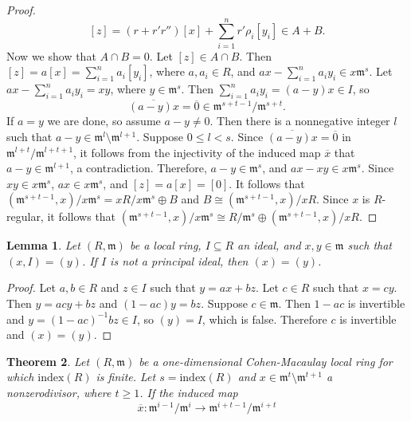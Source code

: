 \documentclass{amsart}
\newtheorem{theorem}{Theorem}[section]
\newtheorem{lemma}[theorem]{Lemma}
\theoremstyle{definition}
\theoremstyle{definition}
\numberwithin{equation}{section}
\theoremstyle{definition}
\begin{document}
{\begin{proof}
 \[[z]=(r+r'r'')[x]+\sum_{i=1}^{n}r'\rho_{i}[y_{i}] \in A+B.\]\text{}\newline
Now we show that $A \cap B=0$. Let $[z] \in A \cap B$. Then $[z]=a[x]=\sum_{i=1}^{n}a_{i}[y_{i}]$, where $a,a_{i} \in R$, and $ax-\sum_{i=1}^{n}a_{i}y_{i}\in x\mathfrak{m}^{s}$. Let $ax-\sum_{i=1}^{n}a_{i}y_{i}=xy$, where $y \in \mathfrak{m}^{s}$. Then $\sum_{i=1}^{n}a_{i}y_{i}=(a-y)x \in I$, so \newline
\[\overline{(a-y)x}=\overline{0} \in \mathfrak{m}^{s+t-1}/\mathfrak{m}^{s+t}.\]\text{}\newline If $a=y$ we are done, so assume $a-y \neq 0$. Then there is a nonnegative integer $l$ such that $a-y \in \mathfrak{m}^{l} \setminus \mathfrak{m}^{l+1}$. Suppose $0 \leq l<s$. Since $\overline{(a-y)x}=\overline{0}$ in $\mathfrak{m}^{l+t}/\mathfrak{m}^{l+t+1}$, it follows from the injectivity of the induced map $\overline{x}$ that $a-y \in \mathfrak{m}^{l+1}$, a contradiction. Therefore, $a-y \in \mathfrak{m}^{s}$, and $ax-xy \in x\mathfrak{m}^{s}$. Since $xy \in x\mathfrak{m}^{s}$, $ax \in x\mathfrak{m}^{s}$, and $[z]=a[x]=[0]$. \newline\newline It follows that $(\mathfrak{m}^{s+t-1},x)/x\mathfrak{m}^{s}=xR/x\mathfrak{m}^{s} \oplus B$ and $B \cong (\mathfrak{m}^{s+t-1},x)/xR$. Since $x$ is $R$-regular, it follows that $(\mathfrak{m}^{s+t-1},x)/x\mathfrak{m}^{s} \cong R/\mathfrak{m}^{s} \oplus (\mathfrak{m}^{s+t-1},x)/xR$.\end{proof}\text{}
\begin{lemma} Let $(R,\mathfrak{m})$ be a local ring, $I \subseteq R$ an ideal, and $x,y \in \mathfrak{m}$ such that $(x,I)=(y)$. If $I$ is not a principal ideal, then $(x)=(y)$. \end{lemma}
\begin{proof} Let $a,b \in R$ and $z \in I$ such that $y=ax+bz$. Let $c \in R$ such that $x=cy$. Then $y=acy+bz$ and $(1-ac)y=bz$. Suppose $c \in \mathfrak{m}$. Then $1-ac$ is invertible and $y=(1-ac)^{-1}bz \in I$, so $(y)=I$, which is false. Therefore $c$ is invertible and $(x)=(y)$. \end{proof}\text{}
\begin{theorem}\label{thm:ineq} Let $(R,\mathfrak{m})$ be a one-dimensional Cohen-Macaulay local ring for which $\text{index}(R)$ is finite. Let $s=\text{index}(R)$ and $x \in \mathfrak{m}^{t} \setminus \mathfrak{m}^{t+1}$ a nonzerodivisor, where $t \geq 1$. If the induced map \newline
\[\overline{x}:\mathfrak{m}^{i-1}/\mathfrak{m}^{i} \longrightarrow \mathfrak{m}^{i+t-1}/\mathfrak{m}^{i+t}\]

\end{theorem}}
\end{document}
